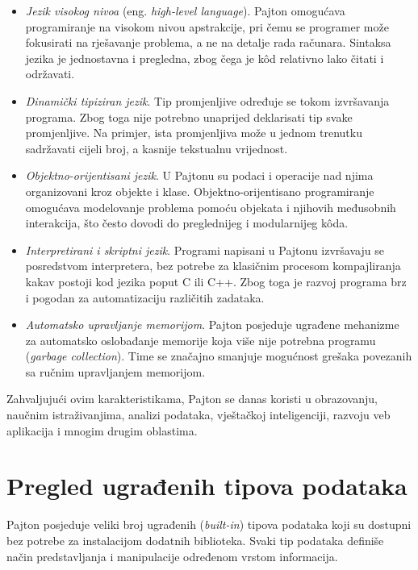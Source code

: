 \begin{itemize}
	\item \textit{Jezik visokog nivoa} (eng. \textit{high-level language}). Pajton omogućava programiranje na visokom nivou apstrakcije, pri čemu se programer može fokusirati na rješavanje problema, a ne na detalje rada računara. Sintaksa jezika je jednostavna i pregledna, zbog čega je k\^od relativno lako čitati i održavati.
	
	\item \textit{Dinamički tipiziran jezik}. Tip promjenljive određuje se tokom izvršavanja programa. Zbog toga nije potrebno unaprijed deklarisati tip svake promjenljive. Na primjer, ista promjenljiva može u jednom trenutku sadržavati cijeli broj, a kasnije tekstualnu vrijednost.
	
	\item \textit{Objektno-orijentisani jezik}. U Pajtonu su podaci i operacije nad njima organizovani kroz objekte i klase. Objektno-orijentisano programiranje omogućava modelovanje problema pomoću objekata i njihovih međusobnih interakcija, što često dovodi do preglednijeg i modularnijeg k\^oda.
	
	\item \textit{Interpretirani i skriptni jezik}. Programi napisani u Pajtonu izvršavaju se posredstvom interpretera, bez potrebe za klasičnim procesom kompajliranja kakav postoji kod jezika poput C ili C++. Zbog toga je razvoj programa brz i pogodan za automatizaciju različitih zadataka.
	
	\item \textit{Automatsko upravljanje memorijom}. Pajton posjeduje ugrađene mehanizme za automatsko oslobađanje memorije koja više nije potrebna programu (\textit{garbage collection}). Time se značajno smanjuje mogućnost grešaka povezanih sa ručnim upravljanjem memorijom.

\end{itemize}

Zahvaljujući ovim karakteristikama, Pajton se danas koristi u obrazovanju, naučnim istraživanjima, analizi podataka, vještačkoj inteligenciji, razvoju veb aplikacija i mnogim drugim oblastima.

\section{Pregled ugrađenih tipova podataka}

Pajton posjeduje veliki broj ugrađenih (\textit{built-in}) tipova podataka koji su dostupni bez potrebe za instalacijom dodatnih biblioteka. Svaki tip podataka definiše način predstavljanja i manipulacije određenom vrstom informacija.

